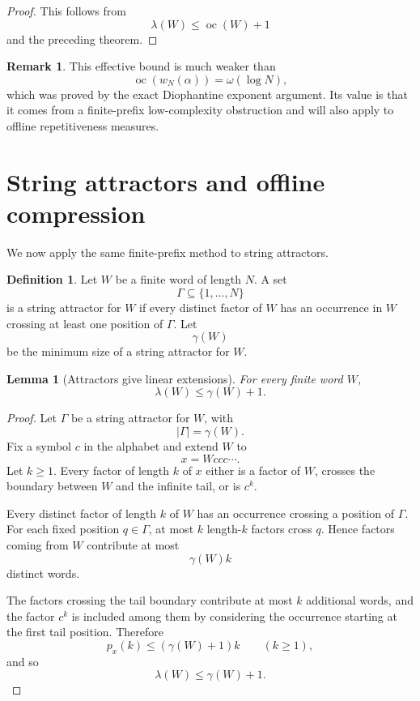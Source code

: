 \documentclass[11pt]{amsart}
\newtheorem{lemma}[theorem]{Lemma}
\theoremstyle{definition}
\newtheorem{definition}[theorem]{Definition}
\newtheorem{remark}[theorem]{Remark}
\DeclareMathOperator{\oc}{oc}
\begin{document}
\begin{proof}
This follows from
\[
\lambda(W)\leq \oc(W)+1
\]
and the preceding theorem.
\end{proof}

\begin{remark}
This effective bound is much weaker than
\[
\oc(w_N(\alpha))=\omega(\log N),
\]
which was proved by the exact Diophantine exponent argument. Its value is that it comes from a finite-prefix low-complexity obstruction and will also apply to offline repetitiveness measures.
\end{remark}

\section{String attractors and offline compression}

We now apply the same finite-prefix method to string attractors.

\begin{definition}
Let \(W\) be a finite word of length \(N\). A set
\[
\Gamma\subseteq \{1,\ldots,N\}
\]
is a string attractor for \(W\) if every distinct factor of \(W\) has an occurrence in \(W\) crossing at least one position of \(\Gamma\). Let
\[
\gamma(W)
\]
be the minimum size of a string attractor for \(W\).
\end{definition}

\begin{lemma}[Attractors give linear extensions]
For every finite word \(W\),
\[
\lambda(W)\leq \gamma(W)+1.
\]
\end{lemma}

\begin{proof}
Let \(\Gamma\) be a string attractor for \(W\), with
\[
|\Gamma|=\gamma(W).
\]
Fix a symbol \(c\) in the alphabet and extend \(W\) to
\[
x=Wccc\cdots.
\]
Let \(k\geq 1\). Every factor of length \(k\) of \(x\) either is a factor of \(W\), crosses the boundary between \(W\) and the infinite tail, or is \(c^k\).

Every distinct factor of length \(k\) of \(W\) has an occurrence crossing a position of \(\Gamma\). For each fixed position \(q\in\Gamma\), at most \(k\) length-\(k\) factors cross \(q\). Hence factors coming from \(W\) contribute at most
\[
\gamma(W)k
\]
distinct words.

The factors crossing the tail boundary contribute at most \(k\) additional words, and the factor \(c^k\) is included among them by considering the occurrence starting at the first tail position. Therefore
\[
p_x(k)\leq (\gamma(W)+1)k
\qquad(k\geq 1),
\]
and so
\[
\lambda(W)\leq \gamma(W)+1.
\]
\end{proof}
\end{document}
